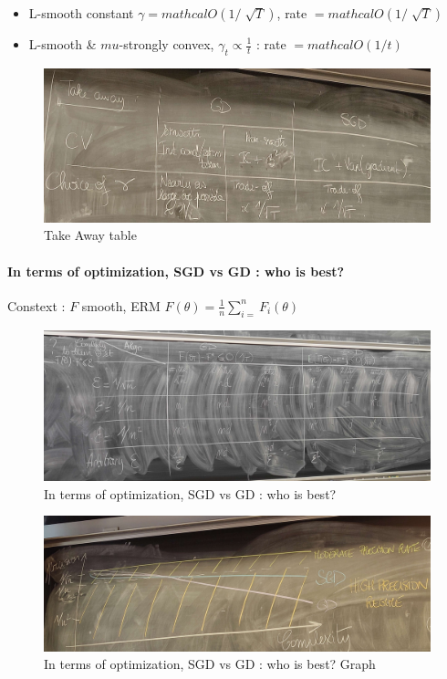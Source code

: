 \begin{note}[]
    \begin{itemize}
        \item L-smooth constant $ \gamma = mathcal{O}(1/\sqrt[]{T}) $, rate $ = mathcal{O}(1/\sqrt[]{T}) $ 
        \item L-smooth \& $ mu $-strongly convex, $ \gamma _t \propto \frac{1}{t} $ : rate $ = mathcal{O}(1/t) $ 
    \end{itemize}
    \begin{figure}[!h]
        \centering
        \includegraphics[width=.8\textwidth]{figs/take_away_table.jpg}
        \caption{Take Away table}
    \end{figure}

    \paragraph*{In terms of optimization, SGD vs GD : who is best?}
    Constext : $F$ smooth, ERM $F(\theta ) = \frac{1}{n} \sum_{i=}^{n} F_i(\theta )$
    \begin{figure}[!h]
        \centering
        \includegraphics[width=.8\textwidth]{figs/SGD_vs_GD.jpg}
        \caption{In terms of optimization, SGD vs GD : who is best? }
    \end{figure}
    \begin{figure}[!h]
        \centering
        \includegraphics[width=.8\textwidth]{figs/SGD_vs_GD_graph.jpg}
        \caption{In terms of optimization, SGD vs GD : who is best? Graph }
    \end{figure}


\end{note}
